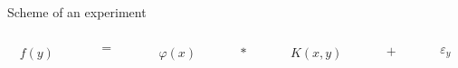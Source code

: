 \documentclass[8pt,pdf,hyperref={unicode}]{beamer}
\begin{document}
\begin{frame}
\begin{block}{Scheme of an experiment}
~~~~\\

    \begin{columns}
        \begin{column}{0.15\textwidth}
            \LARGE{
                $$
                f(y)
                $$
                }
        \end{column}
        \begin{column}{0.05\textwidth}
                \LARGE{
                    $$
                    =
                    $$
                }
        \end{column}
        \begin{column}{0.15\textwidth}
            \LARGE{
                $$
                \varphi(x)
                $$}
        \end{column}
        \begin{column}{0.05\textwidth}
                            \LARGE{
                                $$
                                \ast
                                $$
                            }
        \end{column}
        \begin{column}{0.15\textwidth}
                        \LARGE{
                            $$
                            K(x,y)
                            $$}
        \end{column}
        \begin{column}{0.05\textwidth}
                            \LARGE{
                                $$
                                +
                                $$
                            }
        \end{column}
        \begin{column}{0.15\textwidth} 
                           \LARGE{
                               $$
                               \varepsilon_y
                               $$
                            }
        \end{column}
    \end{columns}
     \end{block}
     

\end{frame}
\end{document}
